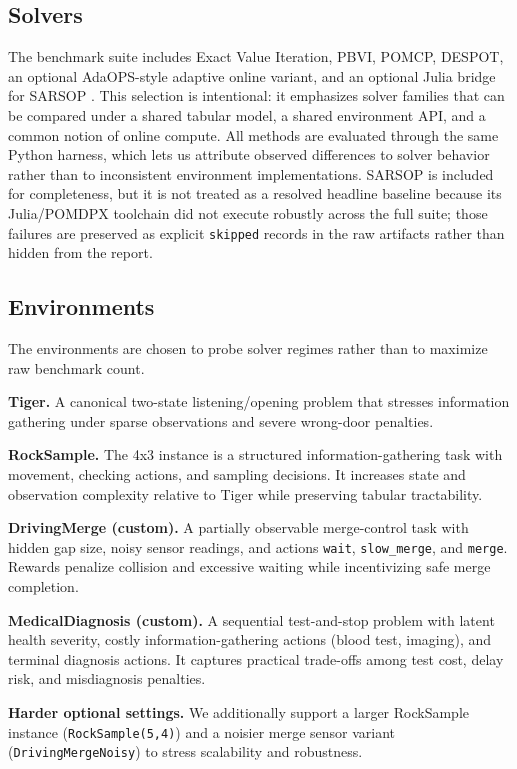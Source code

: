 \documentclass[10pt,twocolumn]{article}
\begin{document}
\subsection{Solvers}
The benchmark suite includes Exact Value Iteration, PBVI, POMCP, DESPOT, an optional AdaOPS-style adaptive online variant, and an optional Julia bridge for SARSOP \citep{kurniawati2008sarsop}. This selection is intentional: it emphasizes solver families that can be compared under a shared tabular model, a shared environment API, and a common notion of online compute. All methods are evaluated through the same Python harness, which lets us attribute observed differences to solver behavior rather than to inconsistent environment implementations. SARSOP is included for completeness, but it is not treated as a resolved headline baseline because its Julia/POMDPX toolchain did not execute robustly across the full suite; those failures are preserved as explicit \texttt{skipped} records in the raw artifacts rather than hidden from the report.

\subsection{Environments}
\noindent The environments are chosen to probe solver regimes rather than to maximize raw benchmark count.

\textbf{Tiger.} A canonical two-state listening/opening problem that stresses information gathering under sparse observations and severe wrong-door penalties.

\textbf{RockSample.} The 4x3 instance is a structured information-gathering task with movement, checking actions, and sampling decisions. It increases state and observation complexity relative to Tiger while preserving tabular tractability.

\textbf{DrivingMerge (custom).} A partially observable merge-control task with hidden gap size, noisy sensor readings, and actions \texttt{wait}, \texttt{slow\_merge}, and \texttt{merge}. Rewards penalize collision and excessive waiting while incentivizing safe merge completion.

\textbf{MedicalDiagnosis (custom).} A sequential test-and-stop problem with latent health severity, costly information-gathering actions (blood test, imaging), and terminal diagnosis actions. It captures practical trade-offs among test cost, delay risk, and misdiagnosis penalties.

\textbf{Harder optional settings.} We additionally support a larger RockSample instance (\texttt{RockSample(5,4)}) and a noisier merge sensor variant (\texttt{DrivingMergeNoisy}) to stress scalability and robustness.
\end{document}
